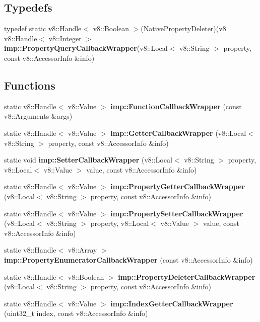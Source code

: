 \subsection*{Typedefs}
\begin{DoxyCompactItemize}
\item 
typedef static v8\+::\+Handle$<$ v8\+::\+Boolean $>$(Native\+Property\+Deleter)(v8 v8\+::\+Handle$<$ v8\+::\+Integer $>$ \textbf{ imp\+::\+Property\+Query\+Callback\+Wrapper}(v8\+::\+Local$<$ v8\+::\+String $>$ property, const v8\+::\+Accessor\+Info \&info)
\end{DoxyCompactItemize}
\subsection*{Functions}
\begin{DoxyCompactItemize}
\item 
static v8\+::\+Handle$<$ v8\+::\+Value $>$ \textbf{ imp\+::\+Function\+Callback\+Wrapper} (const v8\+::\+Arguments \&args)
\item 
static v8\+::\+Handle$<$ v8\+::\+Value $>$ \textbf{ imp\+::\+Getter\+Callback\+Wrapper} (v8\+::\+Local$<$ v8\+::\+String $>$ property, const v8\+::\+Accessor\+Info \&info)
\item 
static void \textbf{ imp\+::\+Setter\+Callback\+Wrapper} (v8\+::\+Local$<$ v8\+::\+String $>$ property, v8\+::\+Local$<$ v8\+::\+Value $>$ value, const v8\+::\+Accessor\+Info \&info)
\item 
static v8\+::\+Handle$<$ v8\+::\+Value $>$ \textbf{ imp\+::\+Property\+Getter\+Callback\+Wrapper} (v8\+::\+Local$<$ v8\+::\+String $>$ property, const v8\+::\+Accessor\+Info \&info)
\item 
static v8\+::\+Handle$<$ v8\+::\+Value $>$ \textbf{ imp\+::\+Property\+Setter\+Callback\+Wrapper} (v8\+::\+Local$<$ v8\+::\+String $>$ property, v8\+::\+Local$<$ v8\+::\+Value $>$ value, const v8\+::\+Accessor\+Info \&info)
\item 
static v8\+::\+Handle$<$ v8\+::\+Array $>$ \textbf{ imp\+::\+Property\+Enumerator\+Callback\+Wrapper} (const v8\+::\+Accessor\+Info \&info)
\item 
static v8\+::\+Handle$<$ v8\+::\+Boolean $>$ \textbf{ imp\+::\+Property\+Deleter\+Callback\+Wrapper} (v8\+::\+Local$<$ v8\+::\+String $>$ property, const v8\+::\+Accessor\+Info \&info)
\item 
static v8\+::\+Handle$<$ v8\+::\+Value $>$ \textbf{ imp\+::\+Index\+Getter\+Callback\+Wrapper} (uint32\+\_\+t index, const v8\+::\+Accessor\+Info \&info)

\end{DoxyCompactItemize}
